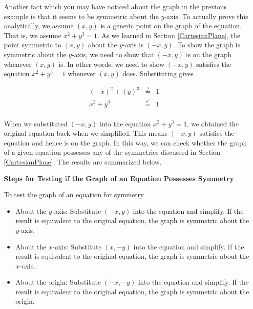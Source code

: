\medskip

Another fact which you may have noticed about the graph in the previous example is that it seems to be symmetric about the $y$-axis.  To actually prove this analytically, we assume $(x,y)$ is a generic point on the graph of the equation. That is, we assume  $x^2 + y^3 = 1$.  As we learned in Section \ref{CartesianPlane},  the point symmetric to $(x,y)$ about the $y$-axis is $(-x,y)$.  To show the graph is symmetric about the $y$-axis, we need to show that $(-x,y)$ is on the graph whenever $(x,y)$ is.  In other words, we need to show $(-x,y)$ satisfies the equation $x^2 + y^3 = 1$ whenever $(x,y)$ does.  Substituting gives

\setlength{\extrarowheight}{2pt}

\[ \begin{array}{rclr}   
(-x)^2+(y)^3 & \stackrel{?}{=} & 1 & \\
   x^2 + y^3 & \stackrel{\checkmark}{=} & 1 & \\ 
   \end{array} \]

When we substituted $(-x,y)$ into the equation $x^2 + y^3 = 1$, we obtained the original equation back when we simplified.  This means $(-x, y)$ satisfies the equation and hence is on the graph.  In this way, we can check whether the graph of a given equation possesses any of the symmetries discussed in Section \ref{CartesianPlane}.  The results are summarized below.

\medskip

\colorbox{ResultColor}{\bbm

\smallskip

\centerline{\textbf{Steps for Testing if the Graph of an Equation Possesses Symmetry}}
\label{symmetrytestequations}

\medskip

\hspace{.17in} To test the graph of an equation for symmetry  

\begin{itemize}

\item About the $y$-axis: Substitute $(-x,y)$ into the equation and simplify.  If the result is equivalent to the original equation, the graph is symmetric about the $y$-axis.

\item About the $x$-axis: Substitute $(x,-y)$ into the equation and simplify.  If the result is equivalent to the original equation, the graph is symmetric about the $x$-axis.

\item About the origin: Substitute $(-x,-y)$ into the equation and simplify. If the result is equivalent to the original equation, the graph is symmetric about the origin.

\smallskip

\end{itemize}

\ebm}

